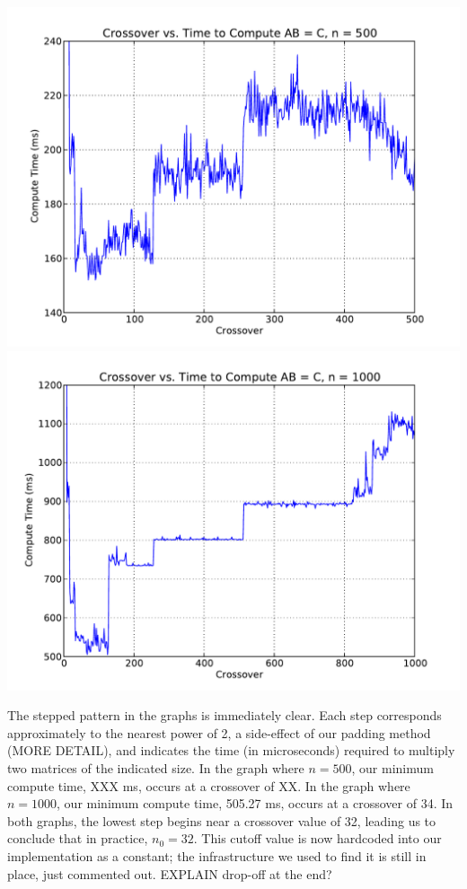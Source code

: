 \documentclass[solution, letterpaper]{cs121}
\begin{document}
\begin{center}
\includegraphics[scale=0.72]{crossover-v-compute-time-500-msec.pdf}
\includegraphics[scale=0.72]{crossover-v-compute-time-1000-msec.pdf}
\end{center}

The stepped pattern in the graphs is immediately clear. Each step corresponds approximately to the nearest power of 2, a side-effect of our padding method (MORE DETAIL), and indicates the time (in microseconds) required to multiply two matrices of the indicated size. In the graph where $n=500$, our minimum compute time, XXX ms, occurs at a crossover of XX. In the graph where $n=1000$, our minimum compute time, 505.27 ms, occurs at a crossover of 34. In both graphs, the lowest step begins near a crossover value of 32, leading us to conclude that in practice, $n_0 = 32$. This cutoff value is now hardcoded into our implementation as a constant; the infrastructure we used to find it is still in place, just commented out. EXPLAIN drop-off at the end?
\end{document}
